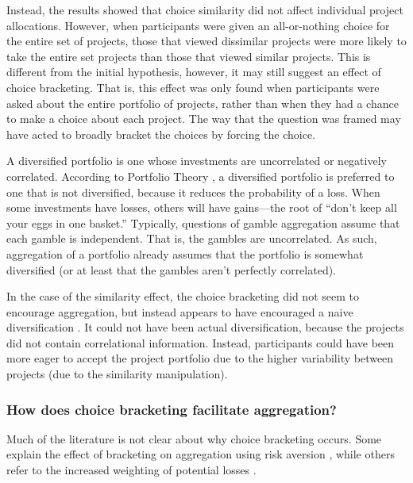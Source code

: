 \documentclass[a4paper, nobind, dvipsnames]{templates/ociamthesis}
\theoremstyle{definition}
\theoremstyle{definition}
\theoremstyle{definition}
\theoremstyle{definition}
\theoremstyle{remark}
\begin{document}
Instead, the results showed that choice similarity did not affect individual
project allocations. However, when participants were given an all-or-nothing
choice for the entire set of projects, those that viewed dissimilar projects
were more likely to take the entire set projects than those that viewed similar
projects. This is different from the initial hypothesis, however, it may still
suggest an effect of choice bracketing. That is, this effect was only found when
participants were asked about the entire portfolio of projects, rather than when
they had a chance to make a choice about each project. The way that the question
was framed may have acted to broadly bracket the choices by forcing the choice.

A diversified portfolio is one whose investments are uncorrelated or negatively
correlated. According to Portfolio Theory \autocite{markowitz1952}, a diversified
portfolio is preferred to one that is not diversified, because it reduces the
probability of a loss. When some investments have losses, others will have
gains---the root of ``don't keep all your eggs in one basket.'' Typically,
questions of gamble aggregation assume that each gamble is independent. That is,
the gambles are uncorrelated. As such, aggregation of a portfolio already
assumes that the portfolio is somewhat diversified (or at least that the gambles
aren't perfectly correlated).

In the case of the similarity effect, the choice bracketing did not seem to
encourage aggregation, but instead appears to have encouraged a naive
diversification \autocite{hedesstrom2006,read1995}. It could not have been actual
diversification, because the projects did not contain correlational information.
Instead, participants could have been more eager to accept the project portfolio
due to the higher variability between projects (due to the similarity
manipulation).

\subsubsection{How does choice bracketing facilitate aggregation?}

Much of the literature \autocite[e.g.,][]{benartzi1999} is not clear about why choice
bracketing occurs. Some explain the effect of bracketing on aggregation using
risk aversion \autocite[e.g.,][]{read1999}, while others refer to the increased weighting
of potential losses \autocite{webb2017}.
\end{document}
